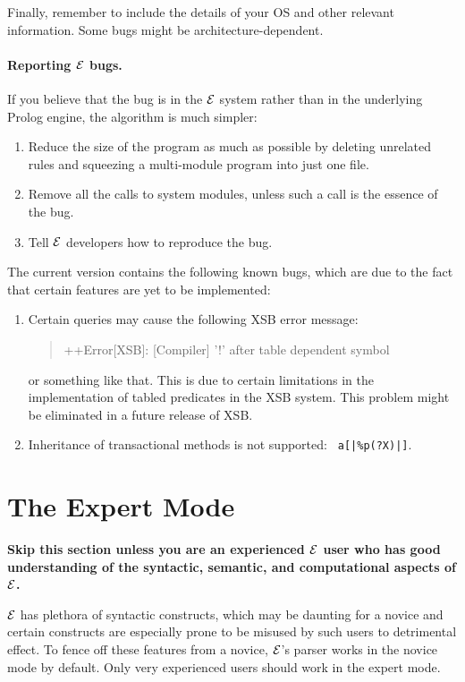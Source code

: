 \documentclass[11pt]{article}
\newcommand{\ERGO}{\mbox{\ensuremath{\cal{E}}\smaller{{\sc{RGO}}}}\xspace}
\newcommand{\FLSYSTEM}{\ERGO}
\begin{document}
Finally, remember to include the details of your OS and other relevant
information. Some bugs might be architecture-dependent.

\paragraph{Reporting \FLSYSTEM bugs.}
If you believe that the bug is in the \FLSYSTEM system rather than in the
underlying Prolog engine, the algorithm is much simpler: 
\begin{enumerate}
  \item Reduce the size of the program as much as possible by deleting 
    unrelated rules and squeezing a multi-module program into
    just one file.
  \item Remove all the calls to system modules, unless such a call is
    the essence of the bug.
  \item Tell \FLSYSTEM developers how to reproduce the bug.
\end{enumerate}

The current version contains the following known bugs, which are due to the
fact that certain features are yet to be implemented:
\begin{enumerate}
  \item  Certain queries may cause the following XSB error message:
    \begin{quote}
     ++Error[XSB]: [Compiler] '!' after table dependent symbol 
    \end{quote}
    or something like that.
    This is due to certain limitations in the implementation of tabled
    predicates in the XSB system. This problem might be eliminated in a
    future release of XSB.
  \item Inheritance of transactional methods is not supported: {\tt
      a[|\%p(?X)|]}.
\end{enumerate}

\section{The Expert Mode}\label{sec-expert}

\textbf{Skip this section unless you are an experienced \FLSYSTEM user who
  has good understanding of the syntactic, semantic, and computational
  aspects of \FLSYSTEM.}

\FLSYSTEM has plethora of syntactic constructs, which may be daunting
for a novice and certain constructs are especially prone
to be misused by such users to detrimental effect.
To fence off these features from a novice, \FLSYSTEM's parser works in the
novice mode by default. Only very experienced users should work in the
expert mode.
\end{document}
